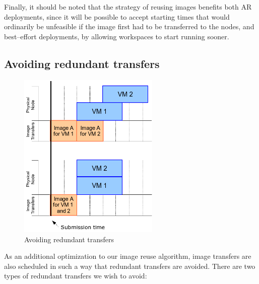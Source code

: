 Finally, it should be noted that the strategy of reusing images benefits both AR deployments, since it will be possible to accept starting times that would ordinarily be unfeasible if the image first had to be transferred to the nodes, and best--effort deployments, by allowing workspaces to start running sooner.

\subsection{Avoiding redundant transfers}

\begin{figure}
  \begin{center}
    \includegraphics[width=0.6\textwidth]{figures/piggybacking.png}
    \caption{Avoiding redundant transfers}
	\label{fig:piggyback}
  \end{center}
\end{figure}

As an additional optimization to our image reuse algorithm, image transfers are also scheduled in such a way that redundant transfers are avoided. There are two types of redundant transfers we wish to avoid:

